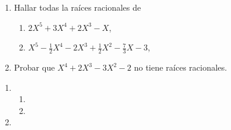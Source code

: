 \begin{enunciado}{\ejercicio}
  \begin{enumerate}[label=\roman*)]
    \item Hallar todas la raíces racionales de
          \begin{enumerate}[label=(\alph*)]
            \item $2X^5 + 3X^4 + 2X^3 - X$,
            \item $X^5 - \frac{1}{2} X^4 - 2X^3 + \frac{1}{2} X^2 - \frac{7}{3}X -3$,
          \end{enumerate}
    \item Probar que $X^4 + 2X^3 - 3X^2 - 2$ no tiene raíces racionales.
  \end{enumerate}
\end{enunciado}

\begin{enumerate}[label=\roman*)]
  \item
        \begin{enumerate}[label=(\alph*)]
          \item \hacer
          \item \hacer
        \end{enumerate}
  \item \hacer
\end{enumerate}
